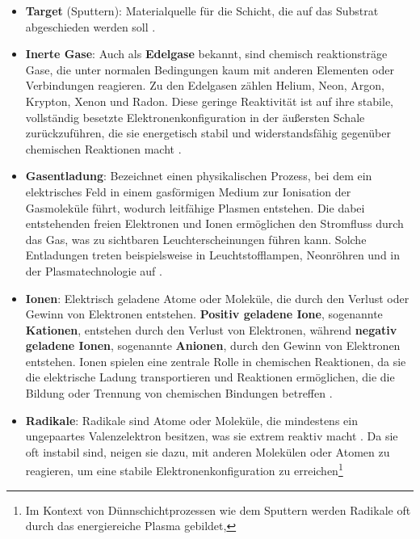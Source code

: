 \documentclass{article} %
\begin{document}
\begin{itemize}
{    Aufdampfanlage} und \autoref{fig:Tiegel und Schiffchen} a).
    \item \textbf{Target} (Sputtern): Materialquelle für die Schicht, die auf das Substrat abgeschieden werden soll \cite{keplinger2024}.
    \item \textbf{Inerte Gase}: Auch als \textbf{Edelgase} bekannt, sind chemisch reaktionsträge Gase, die unter normalen Bedingungen kaum mit 
    anderen Elementen oder Verbindungen reagieren. Zu den Edelgasen zählen Helium, Neon, Argon, Krypton, Xenon und Radon. Diese geringe Reaktivität ist auf 
    ihre stabile, vollständig besetzte Elektronenkonfiguration in der äußersten Schale zurückzuführen, die sie energetisch stabil und widerstandsfähig gegenüber 
    chemischen Reaktionen macht \cite{atkins_physical_chemistry, zumdahl_chemistry, silberberg_chemistry}.
    \item \textbf{Gasentladung}: Bezeichnet einen physikalischen Prozess, bei dem ein elektrisches Feld in einem gasförmigen Medium zur 
    Ionisation der Gasmoleküle führt, wodurch leitfähige Plasmen entstehen. Die dabei entstehenden freien Elektronen und Ionen ermöglichen den Stromfluss durch 
    das Gas, was zu sichtbaren Leuchterscheinungen führen kann. Solche Entladungen treten beispielsweise in Leuchtstofflampen, Neonröhren und in der 
    Plasmatechnologie auf \cite{prechtl2005grundlagen, boehler1994, hutchings2018}.
    \item \textbf{Ionen}: Elektrisch geladene Atome oder Moleküle, die durch den Verlust oder Gewinn von Elektronen entstehen. \textbf{Positiv geladene Ione}, 
    sogenannte \textbf{Kationen}, entstehen durch den Verlust von Elektronen, während \textbf{negativ geladene Ionen}, sogenannte \textbf{Anionen}, durch den 
    Gewinn von Elektronen entstehen. Ionen spielen eine zentrale Rolle in chemischen Reaktionen, da sie die elektrische Ladung transportieren und Reaktionen 
    ermöglichen, die die Bildung oder Trennung von chemischen Bindungen betreffen \cite{petrucci_general_chemistry, chang_chemistry, brown_chemistry_textbook}.
    \item \textbf{Radikale}: Radikale sind Atome oder Moleküle, die mindestens ein ungepaartes Valenzelektron besitzen, was sie extrem reaktiv macht 
    \cite{atkins2010, feynman2011}. Da sie oft instabil sind, neigen sie dazu, mit anderen Molekülen oder Atomen zu reagieren, um eine stabile 
    Elektronenkonfiguration zu erreichen\footnote{Im Kontext von Dünnschichtprozessen wie dem Sputtern werden Radikale oft durch das energiereiche Plasma gebildet, 
}
\end{itemize}
\end{document}
